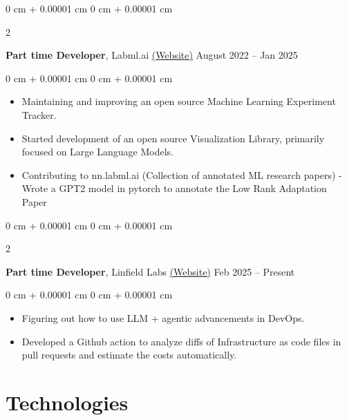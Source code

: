\documentclass[10pt, letterpaper]{article}
\newenvironment{highlights}{
    \begin{itemize}[
        topsep=0.10 cm,
        parsep=0.10 cm,
        partopsep=0pt,
        itemsep=0pt,
        leftmargin=0 cm + 10pt
    ]
}{
    \end{itemize}
} %
\newenvironment{onecolentry}{
    \begin{adjustwidth}{
        0 cm + 0.00001 cm
    }{
        0 cm + 0.00001 cm
    }
}{
    \end{adjustwidth}
} %
\newenvironment{twocolentry}[2][]{
    \onecolentry
    \def\secondColumn{#2}
    \setcolumnwidth{\fill, 6.5 cm}
    \begin{paracol}{2}
}{
    \switchcolumn \raggedleft \secondColumn
    \end{paracol}
    \endonecolentry
} %
\let\hrefWithoutArrow\href
\begin{document}
        \vspace{0.2 cm}

        \begin{twocolentry}{
            August 2022 – Jan 2025
        }
            \textbf{Part time Developer}, Labml.ai \hrefWithoutArrow{https://labml.ai/}{(Website)}\end{twocolentry}

        \vspace{0.10 cm}
        \begin{onecolentry}
            \begin{highlights}
                \item Maintaining and improving an open source Machine Learning Experiment Tracker.
                \item Started development of an open source Visualization Library, primarily focused on Large Language Models.
                \item Contributing to nn.labml.ai (Collection of annotated ML research papers) - Wrote a GPT2 model in pytorch to annotate the Low Rank Adaptation Paper
            \end{highlights}
        \end{onecolentry}

        \vspace{0.2 cm}

        \begin{twocolentry}{
            Feb 2025 – Present
        }
            \textbf{Part time Developer}, Linfield Labs \hrefWithoutArrow{https://github.com/linfieldlabs}{(Website)}\end{twocolentry}

        \vspace{0.10 cm}
        \begin{onecolentry}
            \begin{highlights}
                \item Figuring out how to use LLM + agentic advancements in DevOps.
                \item Developed a Github action to analyze diffs of Infrastructure as code files in pull requests and estimate the costs automatically.
            \end{highlights}
        \end{onecolentry}

        \vspace{0.2 cm}


    
    \section{Technologies}
\end{document}

